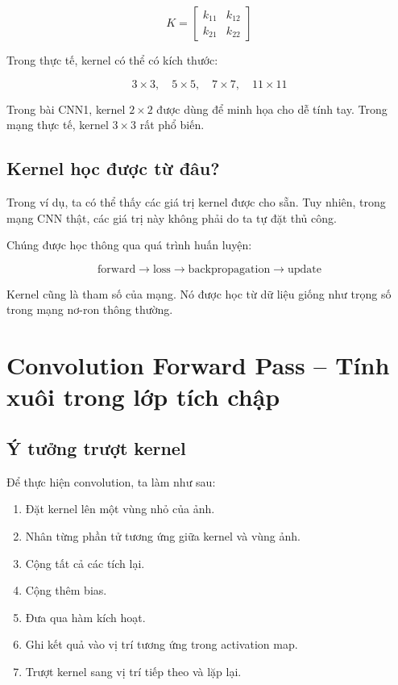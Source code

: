 \[
    K =
    \begin{bmatrix}
    k_{11} & k_{12}\\
    k_{21} & k_{22}
    \end{bmatrix}
\]

Trong thực tế, kernel có thể có kích thước:

\[
    3 \times 3,\quad 5 \times 5,\quad 7 \times 7,\quad 11 \times 11
\]

\begin{luuy}
Trong bài CNN1, kernel $2 \times 2$ được dùng để minh họa cho dễ tính tay. Trong mạng thực tế, kernel $3 \times 3$ rất phổ biến.
\end{luuy}

\subsection{Kernel học được từ đâu?}

Trong ví dụ, ta có thể thấy các giá trị kernel được cho sẵn. Tuy nhiên, trong mạng CNN thật, các giá trị này không phải do ta tự đặt thủ công.

Chúng được học thông qua quá trình huấn luyện:

\[
    \text{forward}
    \rightarrow
    \text{loss}
    \rightarrow
    \text{backpropagation}
    \rightarrow
    \text{update}
\]

\begin{ghinho}
Kernel cũng là tham số của mạng. Nó được học từ dữ liệu giống như trọng số trong mạng nơ-ron thông thường.
\end{ghinho}

\section{Convolution Forward Pass -- Tính xuôi trong lớp tích chập}

\subsection{Ý tưởng trượt kernel}

Để thực hiện convolution, ta làm như sau:

\begin{enumerate}[label=\arabic*.]
    \item Đặt kernel lên một vùng nhỏ của ảnh.
    \item Nhân từng phần tử tương ứng giữa kernel và vùng ảnh.
    \item Cộng tất cả các tích lại.
    \item Cộng thêm bias.
    \item Đưa qua hàm kích hoạt.
    \item Ghi kết quả vào vị trí tương ứng trong activation map.
    \item Trượt kernel sang vị trí tiếp theo và lặp lại.
\end{enumerate}

